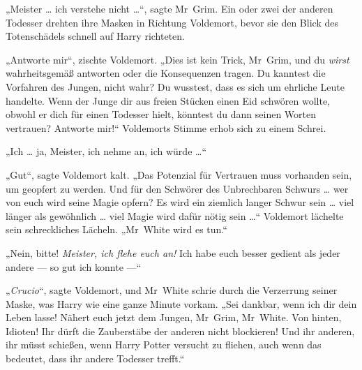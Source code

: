 „Meister … ich verstehe nicht …“, sagte Mr~Grim.
Ein oder zwei der anderen Todesser drehten ihre Masken in Richtung Voldemort, bevor sie den Blick des Totenschädels schnell auf Harry richteten.

„Antworte mir“, zischte Voldemort.
„Dies ist kein Trick, Mr~Grim, und du \emph{wirst} wahrheitsgemäß antworten oder die Konsequenzen tragen. Du kanntest die Vorfahren des Jungen, nicht wahr? Du wusstest, dass es sich um ehrliche Leute handelte. Wenn der Junge dir aus freien Stücken einen Eid schwören wollte, obwohl er dich für einen Todesser hielt, könntest du dann seinen Worten vertrauen? Antworte mir!“
Voldemorts Stimme erhob sich zu einem Schrei.

„Ich … ja, Meister, ich nehme an, ich würde …“

„Gut“, sagte Voldemort kalt.
„Das Potenzial für Vertrauen muss vorhanden sein, um geopfert zu werden. Und für den Schwörer des Unbrechbaren Schwurs … wer von euch wird seine Magie opfern? Es wird ein ziemlich langer Schwur sein … viel länger als gewöhnlich … viel Magie wird dafür nötig sein …“
Voldemort lächelte sein schreckliches Lächeln.
„Mr~White wird es tun.“

„Nein, bitte! \emph{Meister, ich flehe euch an!} Ich habe euch besser gedient als jeder andere — so gut ich konnte —“

„\emph{Crucio}“, sagte Voldemort, und Mr~White schrie durch die Verzerrung seiner Maske, was Harry wie eine ganze Minute vorkam.
„Sei dankbar, wenn ich dir dein Leben lasse! Nähert euch jetzt dem Jungen, Mr~Grim, Mr~White. Von hinten, Idioten! Ihr dürft die Zauberstäbe der anderen nicht blockieren! Und ihr anderen, ihr müsst schießen, wenn Harry Potter versucht zu fliehen, auch wenn das bedeutet, dass ihr andere Todesser trefft.“


